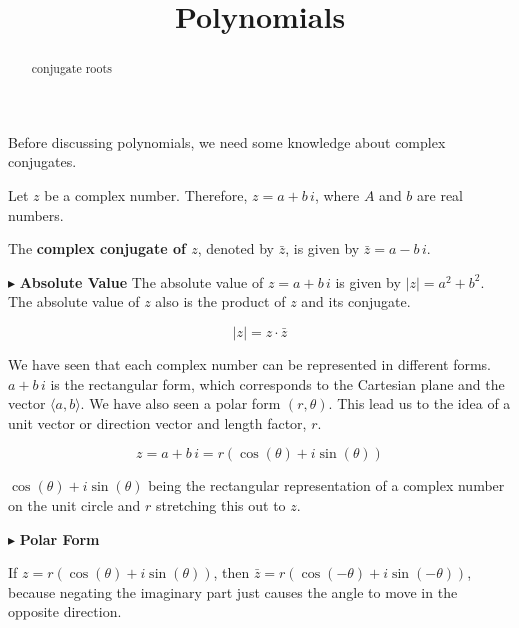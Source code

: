 \documentclass{ximera}
\title{Polynomials}
\begin{document}
\begin{abstract}
conjugate roots
\end{abstract}
\maketitle







Before discussing polynomials, we need some knowledge about complex conjugates.




\begin{definition}

Let $z$ be a complex number.  Therefore, $z = a + b \, i$, where $A$ and $b$ are real numbers.



The \textbf{complex conjugate of $z$}, denoted by $\bar{z}$, is given by $\bar{z} = a - b \, i$.



\end{definition}






$\blacktriangleright$ \textbf{Absolute Value}
The absolute value of $z = a + b \, i$ is given by $|z| = a^2 + b^2$. The absolute value of $z$ also is the product of $z$ and its conjugate.

\[   |z| = z \cdot \bar{z}    \]





We have seen that each complex number can be represented in different forms.  $a + b \, i$ is the rectangular form, which corresponds to the Cartesian plane and the vector $\langle a, b\rangle$.  We have also seen a polar form $(r, \theta)$.  This lead us to the idea of a unit vector or direction vector and length factor, $r$.

\[ z = a + b \, i = r (\cos(\theta) + i \sin(\theta))  \]


$\cos(\theta) + i \sin(\theta)$ being the rectangular representation of a complex number on the unit circle and $r$ stretching this out to $z$.






$\blacktriangleright$ \textbf{Polar Form}

If $z = r (\cos(\theta) + i \sin(\theta))$, then $\bar{z} = r (\cos(-\theta) + i \sin(-\theta))$, because negating the imaginary part just causes the angle to move in the opposite direction.
\end{document}
